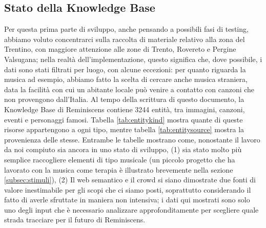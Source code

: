 \documentclass[sigproc-sp.tex]{subfiles}
\begin{document}
\subsection{Stato della Knowledge Base}
Per questa prima parte di sviluppo, anche pensando a possibili fasi di testing, abbiamo voluto concentrarci sulla raccolta di materiale relativo alla zona del Trentino, con maggiore attenzione alle zone di Trento, Rovereto e Pergine Valsugana; nella realtà dell’implementazione, questo significa che, dove possibile, i dati sono stati filtrati per luogo, con alcune eccezioni: per quanto riguarda la musica ad esempio, abbiamo fatto la scelta di cercare anche musica straniera, data la facilità con cui un abitante locale può venire a contatto con canzoni che non provengono dall’Italia. Al tempo della scrittura di questo documento, la Knowledge Base di Reminiscens contiene 3244 entità, tra immagini, canzoni, eventi e personaggi famosi. Tabella \ref{tab:entitykind} mostra quante di queste risorse appartengono a ogni tipo, mentre tabella \ref{tab:entitysource} mostra la provenienza delle stesse. Entrambe le tabelle mostrano come, nonostante il lavoro da noi compiuto sia ancora in uno stato di sviluppo, (1) sia stato molto più semplice raccogliere elementi di tipo musicale (un piccolo progetto che ha lavorato con la musica come terapia è illustrato brevemente nella sezione \ref{subsec:stimuli}), (2) Il web semantico e il crowd si siano dimostrate due fonti di valore inestimabile per gli scopi che ci siamo posti, soprattutto considerando il fatto di averle sfruttate in maniera non intensiva; i dati qui mostrati sono solo uno degli input che è necessario analizzare approfonditamente per scegliere quale strada tracciare per il futuro di Reminiscens.
\end{document}
